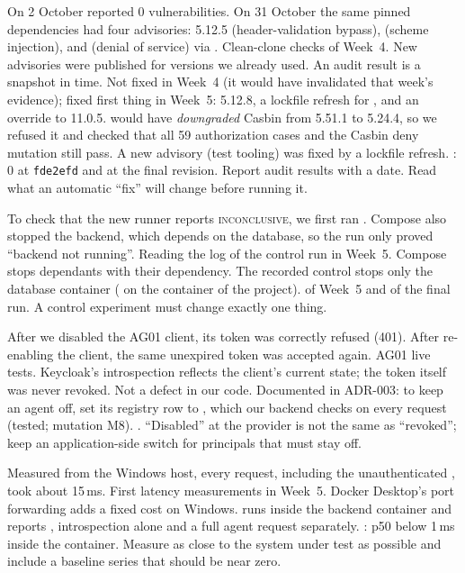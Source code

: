 {On 2 October  reported 0 vulnerabilities. On 31 October the same pinned dependencies had four advisories:  5.12.5 (header-validation bypass),  (scheme injection), and  (denial of service) via .}
{Clean-clone checks of Week~4.}
{New advisories were published for versions we already used. An audit result is a snapshot in time.}
{Not fixed in Week~4 (it would have invalidated that week's evidence); fixed first thing in Week~5:  5.12.8, a lockfile refresh for , and an override to  11.0.5.  would have \emph{downgraded} Casbin from 5.51.1 to 5.24.4, so we refused it and checked that all 59 authorization cases and the Casbin deny mutation still pass. A new  advisory (test tooling) was fixed by a lockfile refresh.}
{: 0 at \texttt{fde2efd} and at the final revision.}
{Report audit results with a date. Read what an automatic ``fix'' will change before running it.}

{To check that the new runner reports \textsc{inconclusive}, we first ran . Compose also stopped the backend, which depends on the database, so the run only proved ``backend not running''.}
{Reading the log of the control run in Week~5.}
{Compose stops dependants with their dependency.}
{The recorded control stops only the database container ( on the  container of the project).}
{ of Week~5 and of the final run.}
{A control experiment must change exactly one thing.}

{After we disabled the AG01 client, its token was correctly refused (401). After re-enabling the client, the same unexpired token was accepted again.}
{AG01 live tests.}
{Keycloak's introspection reflects the client's current state; the token itself was never revoked.}
{Not a defect in our code. Documented in ADR-003: to keep an agent off, set its registry row to , which our backend checks on every request (tested; mutation M8).}
{.}
{``Disabled'' at the provider is not the same as ``revoked''; keep an application-side switch for principals that must stay off.}

{Measured from the Windows host, every request, including the unauthenticated , took about 15\,ms.}
{First latency measurements in Week~5.}
{Docker Desktop's port forwarding adds a fixed cost on Windows.}
{ runs inside the backend container and reports , introspection alone and a full agent request separately.}
{:  p50 below 1\,ms inside the container.}
{Measure as close to the system under test as possible and include a baseline series that should be near zero.}

